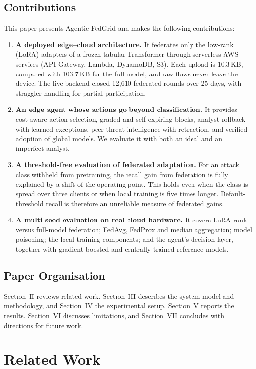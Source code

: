 \documentclass[conference]{IEEEtran}
\begin{document}
\subsection{Contributions}
This paper presents Agentic FedGrid and makes the following contributions:
\begin{enumerate}
\item \textbf{A deployed edge--cloud architecture.} It federates only the
low-rank (LoRA) adapters of a frozen tabular Transformer through serverless
AWS services (API Gateway, Lambda, DynamoDB, S3). Each upload is 10.3\,KB,
compared with 103.7\,KB for the full model, and raw flows never leave the
device. The live backend closed 12{,}610 federated rounds over 25 days,
with straggler handling for partial participation.
\item \textbf{An edge agent whose actions go beyond classification.} It
provides cost-aware action selection, graded and self-expiring blocks,
analyst rollback with learned exceptions, peer threat intelligence with
retraction, and verified adoption of global models. We evaluate it with
both an ideal and an imperfect analyst.
\item \textbf{A threshold-free evaluation of federated adaptation.} For an
attack class withheld from pretraining, the recall gain from federation is
fully explained by a shift of the operating point. This holds even when the
class is spread over three clients or when local training is five times
longer. Default-threshold recall is therefore an unreliable measure of
federated gains.
\item \textbf{A multi-seed evaluation on real cloud hardware.} It covers
LoRA rank versus full-model federation; FedAvg, FedProx and median
aggregation; model poisoning; the local training components; and the agent's
decision layer, together with gradient-boosted and centrally trained
reference models.
\end{enumerate}

\subsection{Paper Organisation}
Section~II reviews related work. Section~III describes the system model and
methodology, and Section~IV the experimental setup. Section~V reports the
results. Section~VI discusses limitations, and Section~VII concludes with
directions for future work.

\section{Related Work}
\end{document}
